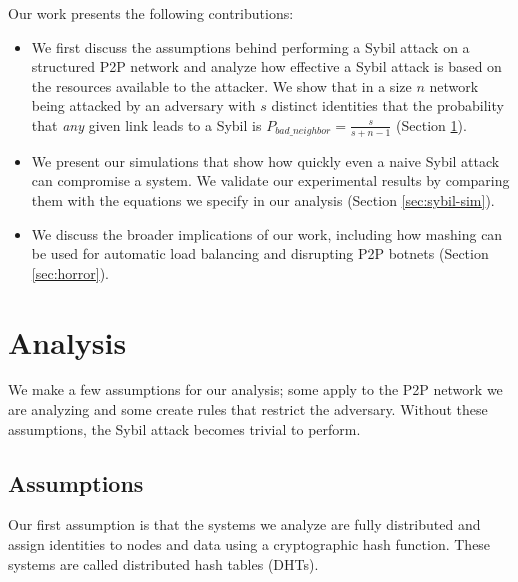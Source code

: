 
Our work presents the following contributions:
\begin{itemize}
	\item We first discuss the assumptions behind performing a Sybil attack on a structured P2P network and analyze how effective a Sybil attack is based on the resources available to the attacker.
	We show that in a size $n$ network being attacked by an adversary with $s$ distinct identities that the probability that \textit{any} given link leads to a Sybil is $P_{bad\_neighbor} =  \frac{s}{s+ n - 1}$ (Section \ref{sec:analysis}). 
	\item We present our simulations that show how quickly even a naive Sybil attack can compromise a system. 
	We validate our experimental results by comparing them with the equations we specify in our analysis (Section \ref{sec:sybil-sim}).
	\item We discuss the broader implications of our work, including how mashing can be used for automatic load balancing and disrupting P2P botnets (Section \ref{sec:horror}).
\end{itemize}

\section{Analysis}
\label{sec:analysis}

We make a few assumptions for our analysis; some apply to the P2P network we are analyzing and some create rules that restrict the adversary.
Without these assumptions, the Sybil attack becomes trivial to perform.


\subsection{Assumptions}
\label{sec:assume}

Our first assumption is that the systems we analyze are fully distributed and assign identities to nodes and data using a cryptographic hash function.
These systems are called distributed hash tables (DHTs).

